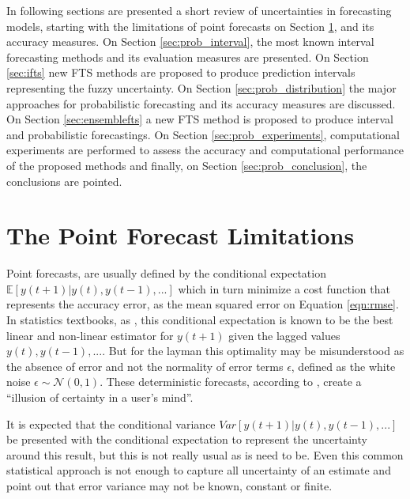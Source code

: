 In following sections are presented a short review of uncertainties in forecasting models, starting with the limitations of point forecasts on Section \ref{sec:prob_point}, and its accuracy measures. On Section \ref{sec:prob_interval}, the most known interval forecasting methods and its evaluation measures are presented. On Section \ref{sec:ifts} new FTS methods are proposed to produce prediction intervals representing the fuzzy uncertainty. On Section \ref{sec:prob_distribution} the major approaches for probabilistic forecasting and its accuracy measures are discussed. On Section \ref{sec:ensemblefts} a new FTS method is proposed to produce interval and probabilistic forecastings. On Section \ref{sec:prob_experiments}, computational experiments are performed to assess the accuracy and computational performance of the proposed methods and finally, on Section \ref{sec:prob_conclusion}, the conclusions are pointed. 

%
\section{The Point Forecast Limitations}
\label{sec:prob_point}


Point forecasts, are usually defined by the conditional expectation $\mathbb{E}[y(t+1)|y(t),y(t-1),...]$ which in turn minimize a cost function that represents the accuracy error, as the mean squared error on Equation \ref{eqn:rmse}. In statistics textbooks, as \cite{Kay2006}, this conditional expectation is  known to be the best linear and non-linear estimator for $y(t+1)$ given the lagged values $y(t),y(t-1),...$. But for the layman this optimality may be misunderstood as the absence of error and not the normality of error terms $\epsilon$, defined as the white noise $\epsilon \sim \mathcal{N}(0,1)$. These deterministic forecasts, according to \cite{Krzysztofowicz2001}, create a ``illusion of certainty in a user's mind''. 

It is expected that the conditional variance $Var[y(t+1)|y(t),y(t-1),...]$ be presented with the conditional expectation to represent the uncertainty around this result, but this is not really usual as is need to be. Even this common statistical approach is not enough to capture all uncertainty of an estimate and \cite{Makridakis2009} point out that error variance may not be known, constant or finite.

